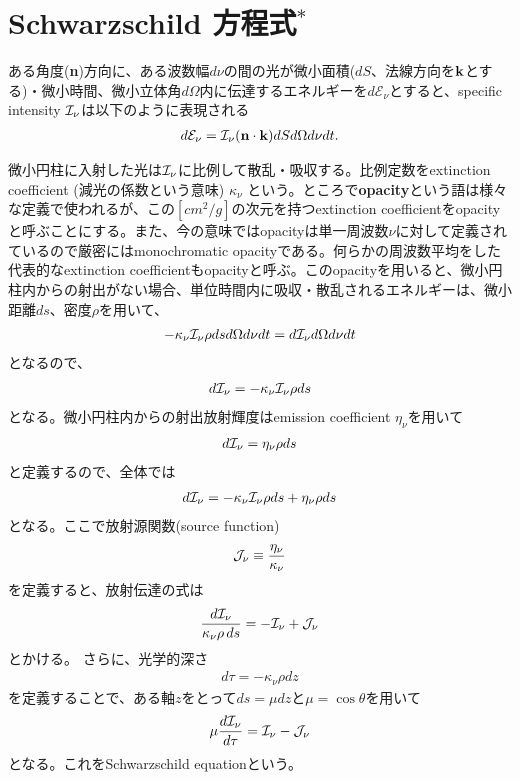 \section{Schwarzschild 方程式$^\ast$}
ある角度({\bf n})方向に、ある波数幅$d \nu$の間の光が微小面積($d S$、法線方向を${\bf k}$とする)・微小時間、微小立体角$d \Omega$内に伝達するエネルギーを$d {\mathcal{E}_\nu}$とすると、specific intensity ${\mathcal{I}_\nu}$は以下のように表現される
\begin{align}
d {\mathcal{E}_\nu} = {\mathcal{I}_\nu} ({\bf n} \cdot {\bf k})  d S d \Omega d \nu d t .
\end{align}

微小円柱に入射した光は${\mathcal{I}_\nu}$に比例して散乱・吸収する。比例定数をextinction coefficient (減光の係数という意味)  $\kappa_\nu$ という。ところで{\bf opacity}という語は様々な定義で使われるが、この$[cm^2/g]$の次元を持つextinction coefficientをopacityと呼ぶことにする。また、今の意味ではopacityは単一周波数$\nu$に対して定義されているので厳密にはmonochromatic opacityである。何らかの周波数平均をした代表的なextinction coefficientもopacityと呼ぶ。このopacityを用いると、微小円柱内からの射出がない場合、単位時間内に吸収・散乱されるエネルギーは、微小距離$ds$、密度$\rho$を用いて、
\begin{align}
- \kappa_\nu {\mathcal{I}_\nu} \rho d s d \Omega d \nu d t = d {\mathcal{I}_\nu} d \Omega d \nu d t
\end{align}
となるので、
\begin{align}
d {\mathcal{I}_\nu} = - \kappa_\nu {\mathcal{I}_\nu} \rho d s
\end{align}
となる。微小円柱内からの射出放射輝度はemission coefficient  $\eta_\nu$を用いて
\begin{align}
d {\mathcal{I}_\nu} =  \eta_\nu \rho d s
\end{align}
と定義するので、全体では
\begin{align}
d {\mathcal{I}_\nu} = - \kappa_\nu {\mathcal{I}_\nu} \rho d s + \eta_\nu \rho d s
\end{align}
となる。ここで放射源関数(source function) 
\begin{align}
{\mathcal{J}_\nu} \equiv \frac{\eta_\nu}{\kappa_\nu}
\end{align}
を定義すると、放射伝達の式は
\begin{align}
\label{eq:radtran}
  \frac{d {\mathcal{I}_\nu}}{\kappa_\nu \rho \, d s} = - {\mathcal{I}_\nu}  + {\mathcal{J}_\nu}
\end{align}
とかける。
さらに、光学的深さ
\begin{align}
d \tau = - \kappa_\nu \rho d z
\label{eq:opticalddef}
\end{align}
を定義することで、ある軸$z$をとって$ds = \mu dz$と$\mu=\cos{\theta}$を用いて
\begin{align}
\label{eq:radtrantau}
  \mu \frac{d {\mathcal{I}_\nu}}{d \tau} = {\mathcal{I}_\nu}  - {\mathcal{J}_\nu}
\end{align}
となる。これをSchwarzschild equationという。


